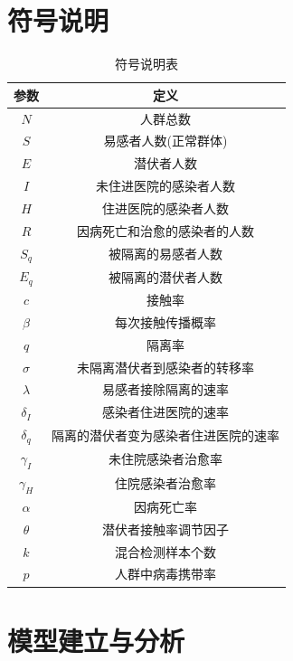 \documentclass[withoutpre]{cumcmthesis} %
\begin{document}
\section{符号说明}
\begin{table}[H]
    \caption{符号说明表}\label{tab:001} \centering
    \begin{tabular}{cc}
        \toprule[1.5pt]
        \textbf{参数} & \textbf{定义}\\
        \midrule[1pt]
        $N$ & 人群总数 \\
        $S$ & 易感者人数(正常群体) \\
        $E$ & 潜伏者人数\\
        $I$ & 未住进医院的感染者人数\\
        $H$ & 住进医院的感染者人数 \\
        $R$ & 因病死亡和治愈的感染者的人数 \\
        $S_q$ & 被隔离的易感者人数 \\
        $E_q$ & 被隔离的潜伏者人数\\
        $c$ & 接触率 \\
        $\beta$ & 每次接触传播概率 \\
        $q$ & 隔离率 \\
        $\sigma$ & 未隔离潜伏者到感染者的转移率 \\
        $\lambda$ & 易感者接除隔离的速率 \\
        $\delta_I$ & 感染者住进医院的速率 \\
        $\delta_q$ & 隔离的潜伏者变为感染者住进医院的速率 \\
        $\gamma_I$ & 未住院感染者治愈率 \\
        $\gamma_H$ & 住院感染者治愈率 \\
        $\alpha$ & 因病死亡率 \\ 
        $\theta$ & 潜伏者接触率调节因子 \\
        $k$ & 混合检测样本个数 \\
        $p$ & 人群中病毒携带率 \\
        \bottomrule[1.5pt]
    \end{tabular}
\end{table}


\section{模型建立与分析}
\end{document}
